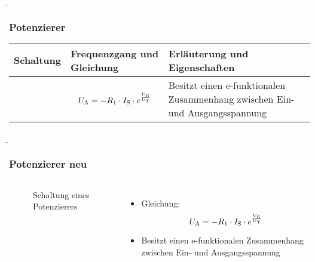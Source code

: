 
\begin{frame}
    \b{
        \frametitle{Potenzierer}
    \centering
    \begin{table}[ht]
    \label{tab:Potenzierer}
    \begin{tabular}{|m{}|m{}|m{}|}
    \hline
    Schaltung & Frequenzgang und Gleichung & Erläuterung und Eigenschaften\\ %
    \hline
    \vspace{0.5cm}
    \centering
    
    &
    \begin{center}
    \[
    U_{\textnormal{A}} =-R_1\cdot I_{\textnormal{S}} \cdot e^{\frac{U_{\textnormal{E}}}{U_{\textnormal{T}}}}
    \]
    \end{center} 
    & 
    Besitzt einen e-funktionalen Zusammenhang zwischen Ein- und Ausgangsspannung \\
    \hline
    \end{tabular}
    \end{table}
    }
\end{frame}

\begin{frame}
    \b{
    \frametitle{Potenzierer neu}
    \begin{columns}
        \centering
        \begin{figure}
        \centering
        {}
        \caption{Schaltung eines Potenzierers}

\end{figure}

        \raggedleft
        \begin{itemize}
            \item Gleichung:
           \[
    U_{\textnormal{A}} =-R_1\cdot I_{\textnormal{S}} \cdot e^{\frac{U_{\textnormal{E}}}{U_{\textnormal{T}}}}
    \]
        \item Besitzt einen e-funktionalen Zusammenhang zwischen Ein- und Ausgangsspannung
    \end{itemize}
    \end{columns}
    }
\end{frame}


